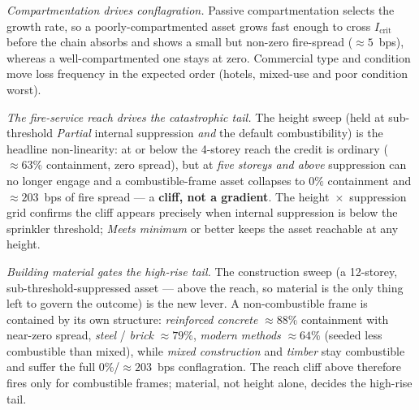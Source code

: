 \documentclass[11pt,a4paper]{article}
\begin{document}
\emph{Compartmentation drives conflagration.} Passive compartmentation selects
the growth rate, so a poorly-compartmented asset grows fast enough to cross
$I_{\text{crit}}$ before the chain absorbs and shows a small but non-zero
fire-spread ($\approx 5$~bps), whereas a well-compartmented one stays at zero.
Commercial type and condition move loss frequency in the expected order (hotels,
mixed-use and poor condition worst).

\emph{The fire-service reach drives the catastrophic tail.} The height sweep
(held at sub-threshold \emph{Partial} internal suppression \emph{and} the default
combustibility) is the headline non-linearity: at or below the 4-storey reach the
credit is ordinary ($\approx 63\%$ containment, zero spread), but at \emph{five
storeys and above} suppression can no longer engage and a combustible-frame asset
collapses to $0\%$ containment and $\approx 203$~bps of fire spread --- a
\textbf{cliff, not a gradient}. The height~$\times$~suppression grid confirms the
cliff appears precisely when internal suppression is below the sprinkler
threshold; \emph{Meets minimum} or better keeps the asset reachable at any height.

\emph{Building material gates the high-rise tail.} The construction sweep (a
12-storey, sub-threshold-suppressed asset --- above the reach, so material is the
only thing left to govern the outcome) is the new lever. A non-combustible frame
is contained by its own structure: \emph{reinforced concrete} $\approx 88\%$
containment with near-zero spread, \emph{steel} / \emph{brick} $\approx 79\%$,
\emph{modern methods} $\approx 64\%$ (seeded less combustible than mixed), while
\emph{mixed construction} and \emph{timber} stay combustible and suffer the full
$0\%$/$\approx 203$~bps conflagration. The reach cliff above therefore fires only
for combustible frames; material, not height alone, decides the high-rise tail.
\end{document}
